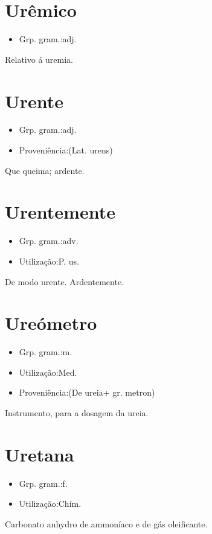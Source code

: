 \documentclass{article}
\begin{document}
\section{Urêmico}
\begin{itemize}
\item {Grp. gram.:adj.}
\end{itemize}
Relativo á uremia.
\section{Urente}
\begin{itemize}
\item {Grp. gram.:adj.}
\end{itemize}
\begin{itemize}
\item {Proveniência:(Lat. \textunderscore urens\textunderscore )}
\end{itemize}
Que queima; ardente.
\section{Urentemente}
\begin{itemize}
\item {Grp. gram.:adv.}
\end{itemize}
\begin{itemize}
\item {Utilização:P. us.}
\end{itemize}
De modo urente.
Ardentemente.
\section{Ureómetro}
\begin{itemize}
\item {Grp. gram.:m.}
\end{itemize}
\begin{itemize}
\item {Utilização:Med.}
\end{itemize}
\begin{itemize}
\item {Proveniência:(De \textunderscore ureia\textunderscore  + gr. \textunderscore metron\textunderscore )}
\end{itemize}
Instrumento, para a dosagem da ureia.
\section{Uretana}
\begin{itemize}
\item {Grp. gram.:f.}
\end{itemize}
\begin{itemize}
\item {Utilização:Chím.}
\end{itemize}
Carbonato anhydro de ammoníaco e de gás oleificante.
\end{document}
